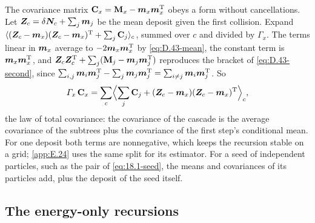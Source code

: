 The covariance matrix $\mathbf{C}_x = \mathbf{M}_x - \bm{m}_x\bm{m}_x^{\mathrm{T}}$ obeys a form without cancellations. Let $\bm{Z}_c = \delta\bm{N}_c + \sum_j\bm{m}_j$ be the mean deposit given the first collision. Expand $\langle(\bm{Z}_c - \bm{m}_x)(\bm{Z}_c - \bm{m}_x)^{\mathrm{T}} + \sum_j\mathbf{C}_j\rangle_c$, summed over $c$ and divided by $\varGamma_x$. The terms linear in $\bm{m}_x$ average to $-2\bm{m}_x\bm{m}_x^{\mathrm{T}}$ by \cref{eq:D.43-mean}, the constant term is $\bm{m}_x\bm{m}_x^{\mathrm{T}}$, and $\bm{Z}_c\bm{Z}_c^{\mathrm{T}} + \sum_j(\mathbf{M}_j - \bm{m}_j\bm{m}_j^{\mathrm{T}})$ reproduces the bracket of \cref{eq:D.43-second}, since $\sum_{i,j}\bm{m}_i\bm{m}_j^{\mathrm{T}} - \sum_j\bm{m}_j\bm{m}_j^{\mathrm{T}} = \sum_{i\ne j}\bm{m}_i\bm{m}_j^{\mathrm{T}}$. So
\begin{equation}
  \varGamma_x\,\mathbf{C}_x = \sum_c\Bigl\langle\sum_j\mathbf{C}_j + (\bm{Z}_c - \bm{m}_x)(\bm{Z}_c - \bm{m}_x)^{\mathrm{T}}\Bigr\rangle_c ,
  \label{eq:D.43-cov}
\end{equation}
the law of total covariance: the covariance of the cascade is the average covariance of the subtrees plus the covariance of the first step's conditional mean. For one deposit both terms are nonnegative, which keeps the recursion stable on a grid; \cref{app:E.24} uses the same split for its estimator. For a seed of independent particles, such as the pair of \cref{eq:18.1-seed}, the means and covariances of its particles add, plus the deposit of the seed itself.

\subsection{The energy-only recursions}

